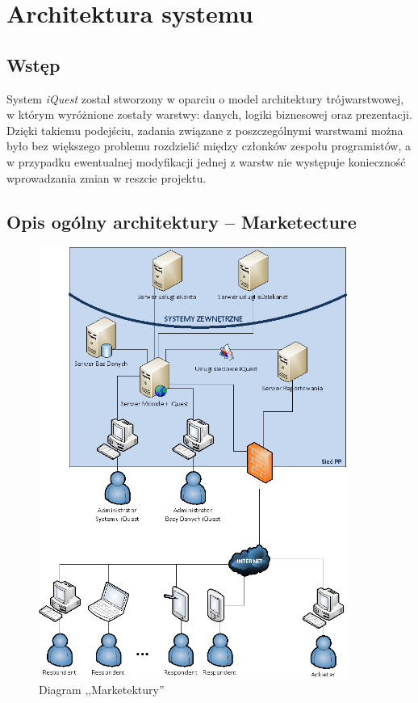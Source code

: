 \chapter{Architektura systemu}
\label{Chapter5}

\section{Wstęp}
\label{Chapter51}

System \textit{iQuest} został stworzony w oparciu o model architektury trójwarstwowej, w którym wyróżnione zostały warstwy: danych, logiki biznesowej oraz prezentacji. Dzięki takiemu podejściu, zadania związane z poszczególnymi warstwami można było bez większego problemu rozdzielić między członków zespołu programistów, a w przypadku ewentualnej modyfikacji jednej z warstw nie występuje konieczność wprowadzania zmian w reszcie projektu.

\section{Opis ogólny architektury -- Marketecture}
\label{Chapter52}

\begin{figure}[H]
\centering\includegraphics[width=0.9\textwidth]{figures/marketecture}
\caption{Diagram ,,Marketektury''}\label{rys:marketecture}
\end{figure}

